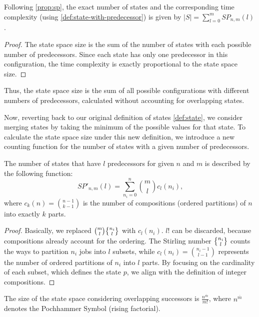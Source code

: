 \begin{corollary}
    \label{cor:ss-without-overlap}
    Following \autoref{prop:sp}, the exact number of states and the corresponding time complexity (using \autoref{def:state-with-predecessor}) is given by $|S| = \sum_{l=0}^m SP_{n,m}(l)$.
\end{corollary}

\begin{proof}
    The state space size is the sum of the number of states with each possible number of predecessors. Since each state has only one predecessor in this configuration, the time complexity is exactly proportional to the state space size.
\end{proof}

Thus, the state space size is the sum of all possible configurations with different numbers of predecessors, calculated without accounting for overlapping states.

Now, reverting back to our original definition of states \ref{def:state}, we consider merging states by taking the minimum of the possible values for that state. To calculate the state space size under this new definition, we introduce a new counting function for the number of states with a given number of predecessors.

\begin{proposition}
    \label{prop:sp'}
    The number of states that have $l$ predecessors for given $n$ and $m$ is described by the following function:
    \[
        SP'_{n,m}(l) = \sum_{n_i=0}^{n} \binom{m}{l} c_l(n_i)\text{,}
    \]
    where $c_k(n) = \binom{n - 1}{k - 1}$ is the number of compositions (ordered partitions) of $n$ into exactly $k$ parts.
\end{proposition}

\begin{proof}
    Basically, we replaced $\binom{m}{l} \stirlingS{n_i}{l}$ with $c_l(n_i)$. $l!$ can be discarded, because compositions already account for the ordering. The Stirling number $\stirlingS{n_i}{l}$ counts the ways to partition $n_i$ jobs into $l$ subsets, while $c_l(n_i) = \binom{n_i - 1}{l - 1}$ represents the number of ordered partitions of $n_i$ into $l$ parts. By focusing on the cardinality of each subset, which defines the state $p$, we align with the definition of integer compositions.
\end{proof}

\begin{lemma}
    The size of the state space considering overlapping successors is $\frac{n^{\overline m}}{m!}$, where $n^{\overline m}$ denotes the Pochhammer Symbol (rising factorial).
\end{lemma}


